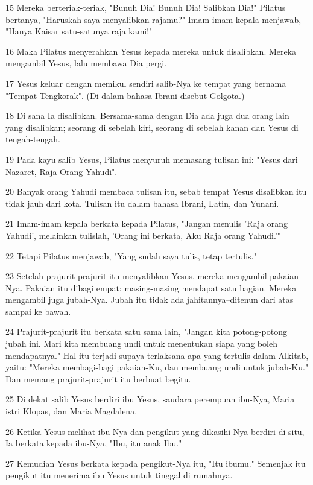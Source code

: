\par 15 Mereka berteriak-teriak, "Bunuh Dia! Bunuh Dia! Salibkan Dia!" Pilatus bertanya, "Haruskah saya menyalibkan rajamu?" Imam-imam kepala menjawab, "Hanya Kaisar satu-satunya raja kami!"
\par 16 Maka Pilatus menyerahkan Yesus kepada mereka untuk disalibkan. Mereka mengambil Yesus, lalu membawa Dia pergi.
\par 17 Yesus keluar dengan memikul sendiri salib-Nya ke tempat yang bernama "Tempat Tengkorak". (Di dalam bahasa Ibrani disebut Golgota.)
\par 18 Di sana Ia disalibkan. Bersama-sama dengan Dia ada juga dua orang lain yang disalibkan; seorang di sebelah kiri, seorang di sebelah kanan dan Yesus di tengah-tengah.
\par 19 Pada kayu salib Yesus, Pilatus menyuruh memasang tulisan ini: "Yesus dari Nazaret, Raja Orang Yahudi".
\par 20 Banyak orang Yahudi membaca tulisan itu, sebab tempat Yesus disalibkan itu tidak jauh dari kota. Tulisan itu dalam bahasa Ibrani, Latin, dan Yunani.
\par 21 Imam-imam kepala berkata kepada Pilatus, "Jangan menulis 'Raja orang Yahudi', melainkan tulislah, 'Orang ini berkata, Aku Raja orang Yahudi.'"
\par 22 Tetapi Pilatus menjawab, "Yang sudah saya tulis, tetap tertulis."
\par 23 Setelah prajurit-prajurit itu menyalibkan Yesus, mereka mengambil pakaian-Nya. Pakaian itu dibagi empat: masing-masing mendapat satu bagian. Mereka mengambil juga jubah-Nya. Jubah itu tidak ada jahitannya--ditenun dari atas sampai ke bawah.
\par 24 Prajurit-prajurit itu berkata satu sama lain, "Jangan kita potong-potong jubah ini. Mari kita membuang undi untuk menentukan siapa yang boleh mendapatnya." Hal itu terjadi supaya terlaksana apa yang tertulis dalam Alkitab, yaitu: "Mereka membagi-bagi pakaian-Ku, dan membuang undi untuk jubah-Ku." Dan memang prajurit-prajurit itu berbuat begitu.
\par 25 Di dekat salib Yesus berdiri ibu Yesus, saudara perempuan ibu-Nya, Maria istri Klopas, dan Maria Magdalena.
\par 26 Ketika Yesus melihat ibu-Nya dan pengikut yang dikasihi-Nya berdiri di situ, Ia berkata kepada ibu-Nya, "Ibu, itu anak Ibu."
\par 27 Kemudian Yesus berkata kepada pengikut-Nya itu, "Itu ibumu." Semenjak itu pengikut itu menerima ibu Yesus untuk tinggal di rumahnya.
